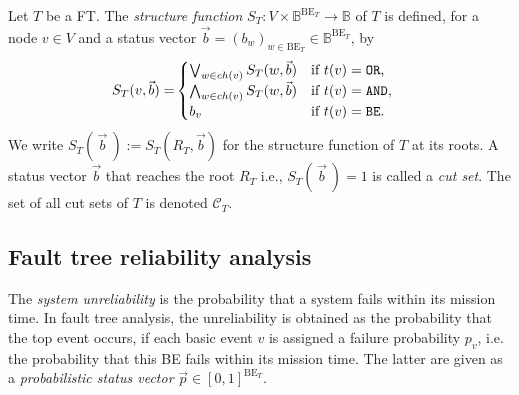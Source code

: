 \documentclass[runningheads]{llncs}
\renewcommand{\emph}[1]{{\it #1}}
\begin{document}
\begin{definition}
\label{def:structure_func}
Let $T$ be a FT. The \emph{structure function} $S_T\colon V \times \mathbb{B}^{\text{BE}_T} \to \mathbb{B}$ of $T$ is defined, for a node $v \in V$ and a status vector $\vec{b}=(b_w)_{w\in \text{BE}_T}\in \mathbb{B}^{\text{BE}_T}$, by
\begin{align*} 
S_T(v,\vec{b}) =&
\begin{cases}
    \bigvee_{w\in ch(v)}S_T(w,\vec{b})  & \parbox{55pt}{if~$t(v)=\mathtt{OR}$,}\\
    \bigwedge_{w\in ch(v)}S_T(w,\vec{b})  & \parbox{55pt}{if~$t(v)=\mathtt{AND}$},\\
    b_v  & \parbox{55pt}{if~$t(v)=\mathtt{BE}$.}
\end{cases}
\end{align*}
We write $S_T(\,\vec{b}\:):= S_T(R_T, \vec{b})$ for the structure function of $T$ at its roots. 
A status vector $\vec{b}$ that reaches the root $R_T$ i.e., 
$S_T(\,\vec{b}\:)=1$ is called a \emph{cut set}. 
The set of all cut sets of $T$ is denoted $\mathcal{C}_T$.
\end{definition}


\subsection{Fault tree reliability analysis}


The \emph{system unreliability} is the probability that a system fails within its mission time. 
In fault tree analysis, the unreliability is obtained as the probability that the top event occurs, if each basic event $v$ is assigned a failure probability $p_v$, i.e. the probability that this BE fails within its mission time. 
%
The latter are given as a \emph{probabilistic status vector} $\vec{p} \in [0,1]^{\text{BE}_T}$.
%
\end{document}
